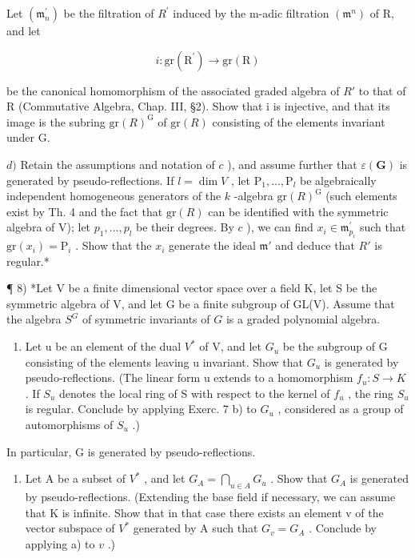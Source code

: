 Let \((\mathfrak{m}_{n}^{\prime})\) be the filtration of \(R^{\prime}\) induced by the m-adic filtration \((\mathfrak{m}^{n})\) of R, and let

\[
i: \mathrm{gr} (\mathrm{R} ^ {\prime}) \to \mathrm{gr} (\mathrm{R})
\]

be the canonical homomorphism of the associated graded algebra of \(R'\) to that of R (Commutative Algebra, Chap. III, §2). Show that i is injective, and that its image is the subring \(\mathrm{gr}(R)^{\mathrm{G}}\) of \(\mathrm{gr}(R)\) consisting of the elements invariant under G.

\(d)\) Retain the assumptions and notation of \(c\) ), and assume further that \(\varepsilon (\mathbf{G})\) is generated by pseudo-reflections. If \(l = \dim V\) , let \(\mathrm{P}_1,\ldots ,\mathrm{P}_l\) be algebraically independent homogeneous generators of the \(k\) -algebra \(\mathrm{gr}(R)^{\mathrm{G}}\) (such elements exist by Th. 4 and the fact that \(\mathrm{gr}(R)\) can be identified with the symmetric algebra of V); let \(p_1,\ldots ,p_l\) be their degrees. By \(c\) ), we can find \(x_{i}\in \mathfrak{m}_{p_{i}}^{\prime}\) such that \(\mathrm{gr}(x_i) = \mathrm{P}_i\) . Show that the \(x_{i}\) generate the ideal \(\mathfrak{m}'\) and deduce that \(R'\) is regular.*

¶ 8) *Let V be a finite dimensional vector space over a field K, let S be the symmetric algebra of V, and let G be a finite subgroup of GL(V). Assume that the algebra \(S^G\) of symmetric invariants of \(G\) is a graded polynomial algebra.

\begin{enumerate}
\def\labelenumi{\alph{enumi})}
\tightlist
\item
  Let u be an element of the dual \(V^{*}\) of V, and let \(G_{u}\) be the subgroup of G consisting of the elements leaving u invariant. Show that \(G_{u}\) is generated by pseudo-reflections. (The linear form u extends to a homomorphism \(f_{u}: S \to K\) . If \(S_{u}\) denotes the local ring of S with respect to the kernel of \(f_{u}\) , the ring \(S_{u}\) is regular. Conclude by applying Exerc. 7 b) to \(G_{u}\) , considered as a group of automorphisms of \(S_{u}\) .)
\end{enumerate}

In particular, G is generated by pseudo-reflections.

\begin{enumerate}
\def\labelenumi{\alph{enumi})}
\setcounter{enumi}{1}
\tightlist
\item
  Let A be a subset of \(V^{*}\) , and let \(G_{A} = \bigcap_{u \in A} G_{u}\) . Show that \(G_{A}\) is generated by pseudo-reflections. (Extending the base field if necessary, we can assume that K is infinite. Show that in that case there exists an element v of the vector subspace of \(V^{*}\) generated by A such that \(G_{v} = G_{A}\) . Conclude by applying a) to \(v\) .)
\end{enumerate}

